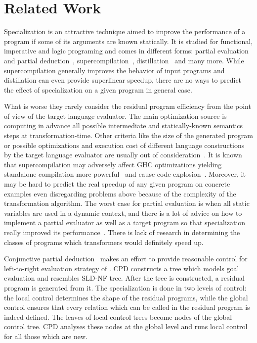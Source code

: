 \section{Related Work}

Specialization is an attractive technique aimed to improve the performance of a program if some of its arguments are known statically.
It is studied for functional, imperative and logic programing and comes in different forms: partial evaluation~\cite{jonesbook} and partial deduction~\cite{lloyd1991partial}, supercompilation~\cite{soerensen1996positive}, distillation~\cite{hamilton2007distillation} and many more.
While supercompilation generally improves the behavior of input programs and distillation can even provide superlinear speedup, there are no ways to predict the effect of specialization on a given program in general case.

What is worse they rarely consider the residual program efficiency from the point of view of the target language evaluator.
The main optimization source is computing in advance all possible intermediate and statically-known semantics steps at transformation-time.
Other criteria like the size of the generated program or possible optimizations and execution cost of different language constructions by the target language evaluator are usually out of consideration~\cite{jonesbook}.
It is known that supercompilation may adversely affect GHC optimizations yielding standalone compilation more powerful~\cite{SCBE,TCES} and cause code explosion~\cite{SCHC}.
Moreover, it may be hard to predict the real speedup of any given program on concrete examples even disregarding problems above because of the complexity of the transformation algorithm.
The worst case for partial evaluation is when all static variables are used in a dynamic context, and there is a lot of advice on how to implement a partial evaluator as well as a target program so that specialization really improved its performance~\cite{jonesbook,bulyonkov84}.
There is lack of research in determining the classes of programs which transformers would definitely speed up.

Conjunctive partial deduction~\cite{de1999conjunctive} makes an effort to provide reasonable control for left-to-right evaluation strategy of \pro{}.
CPD constructs a tree which models goal evaluation and resembles SLD-NF tree.
After the tree is constructed, a residual program is generated from it.
The specialization is done in two levels of control: the local control determines the shape of the residual programs, while the global control ensures that every relation which can be called in the residual program is indeed defined.
The leaves of local control trees become nodes of the global control tree.
CPD analyses these nodes at the global level and runs local control for all those which are new.

